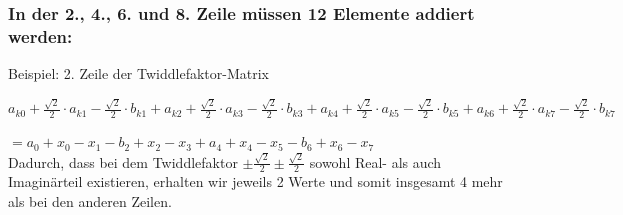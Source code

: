 \begin{frame}\frametitle{In der 2., 4., 6. und 8. Zeile müssen 12 Elemente addiert werden:}
\vspace{-1cm}
Beispiel: 2. Zeile der Twiddlefaktor-Matrix\\
\vspace{1cm}

 $a_{k0} + \frac{\sqrt{2}}{2} \cdot a_{k1} - \frac{\sqrt{2}}{2} \cdot b_{k1} + a_{k2} + \frac{\sqrt{2}}{2} \cdot a_{k3} - \frac{\sqrt{2}}{2} \cdot b_{k3} + a_{k4} + \frac{\sqrt{2}}{2} \cdot a_{k5} - \frac{\sqrt{2}}{2} \cdot b_{k5} + a_{k6} + \frac{\sqrt{2}}{2} \cdot a_{k7} - \frac{\sqrt{2}}{2} \cdot b_{k7}$\\
 
 \vspace{0.5cm}
 
 $= a_0 + x_0 - x_1 - b_2 + x_2 - x_3 + a_4 + x_4 - x_5 - b_6 + x_6 - x_7$\\
 
 \vspace{1cm}
 Dadurch, dass bei dem Twiddlefaktor $\pm \frac{\sqrt{2}}{2} \pm \frac{\sqrt{2}}{2}$ sowohl Real- als auch Imaginärteil existieren, erhalten wir jeweils 2 Werte und somit insgesamt 4 mehr als bei den anderen Zeilen.
\end{frame}

